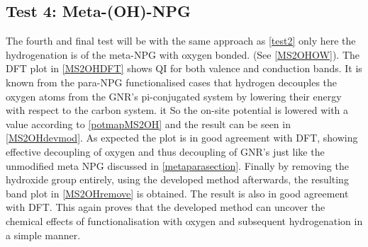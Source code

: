 \subsection{Test 4: Meta-(OH)-NPG}\label{test4}
The fourth and final test will be with the same approach as \cref{test2} only here the hydrogenation is of the meta-NPG with oxygen bonded. (See \cref{MS2OHOW}). The DFT plot in \cref{MS2OHDFT} shows QI for both valence and conduction bands. It is known from the para-NPG functionalised cases that hydrogen decouples the oxygen atoms from the GNR's pi-conjugated system by lowering their energy with respect to the carbon system. it So the on-site potential is lowered with a value according to \cref{potmapMS2OH} and the result can be seen in \cref{MS2OHdevmod}. As expected the plot is in good agreement with DFT, showing effective decoupling of oxygen and thus decoupling of GNR's just like the unmodified meta NPG discussed in \cref{metaparasection}. Finally by removing the hydroxide group entirely, using the developed method afterwards, the resulting band plot in \cref{MS2OHremove} is obtained. The result is also in good agreement with DFT. This again proves that the developed method can uncover the chemical effects of functionalisation with oxygen and subsequent hydrogenation in a simple manner.
